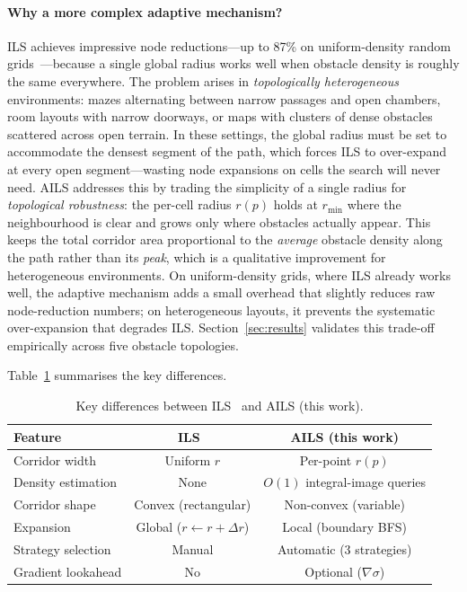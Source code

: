\documentclass[journal]{IEEEtran}
\begin{document}
\paragraph{Why a more complex adaptive mechanism?}
ILS achieves impressive node reductions---up to 87\% on uniform-density random grids~\cite{elshahed2025ils}---because a single global radius works well when obstacle density is roughly the same everywhere.
The problem arises in \emph{topologically heterogeneous} environments: mazes alternating between narrow passages and open chambers, room layouts with narrow doorways, or maps with clusters of dense obstacles scattered across open terrain.
In these settings, the global radius must be set to accommodate the densest segment of the path, which forces ILS to over-expand at every open segment---wasting node expansions on cells the search will never need.
AILS addresses this by trading the simplicity of a single radius for \emph{topological robustness}: the per-cell radius $r(p)$ holds at $r_{\min}$ where the neighbourhood is clear and grows only where obstacles actually appear.
This keeps the total corridor area proportional to the \emph{average} obstacle density along the path rather than its \emph{peak}, which is a qualitative improvement for heterogeneous environments.
On uniform-density grids, where ILS already works well, the adaptive mechanism adds a small overhead that slightly reduces raw node-reduction numbers; on heterogeneous layouts, it prevents the systematic over-expansion that degrades ILS.
Section~\ref{sec:results} validates this trade-off empirically across five obstacle topologies.

Table~\ref{tab:ils_vs_ails} summarises the key differences.

\begin{table}[h]
\centering
\caption{Key differences between ILS~\cite{elshahed2025ils} and AILS (this work).}
\label{tab:ils_vs_ails}
\begin{tabular}{lcc}
\toprule
Feature & ILS~\cite{elshahed2025ils} & \textbf{AILS (this work)} \\
\midrule
Corridor width & Uniform $r$ & Per-point $r(p)$ \\
Density estimation & None & $O(1)$ integral-image queries \\
Corridor shape & Convex (rectangular) & Non-convex (variable) \\
Expansion & Global ($r \leftarrow r + \Delta r$) & Local (boundary BFS) \\
Strategy selection & Manual & Automatic (3 strategies) \\
Gradient lookahead & No & Optional ($\nabla\sigma$) \\
\bottomrule
\end{tabular}
\end{table}
\end{document}
